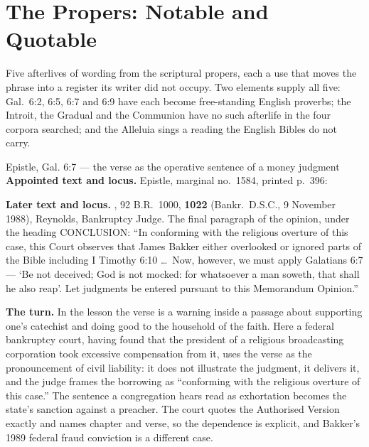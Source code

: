 \sectionguard
\section*{The Propers: Notable and Quotable}

Five afterlives of wording from the scriptural propers, each a use that moves the
phrase into a register its writer did not occupy. Two elements supply all five:
Gal.\ 6:2, 6:5, 6:7 and 6:9 have each become free-standing English proverbs; the
Introit, the Gradual and the Communion have no such afterlife in the four corpora
searched; and the Alleluia sings a reading the English Bibles do not carry.

\begin{afterlife}{Epistle, Gal. 6:7 --- the verse as the operative sentence of a money judgment}
\textbf{Appointed text and locus.} Epistle, marginal no.~1584, printed p.~396:

\textbf{Later text and locus.} , 92 B.R.\ 1000, \textbf{1022} (Bankr.\
D.S.C., 9 November 1988), Reynolds, Bankruptcy Judge. The final paragraph of the
opinion, under the heading CONCLUSION: ``In conforming with the religious overture
of this case, this Court observes that James Bakker either overlooked or ignored
parts of the Bible including I Timothy 6:10 \dots\ Now, however, we must apply
Galatians 6:7 --- `Be not deceived; God is not mocked: for whatsoever a man
soweth, that shall he also reap'. Let judgments be entered pursuant to this
Memorandum Opinion.''

\textbf{The turn.} In the lesson the verse is a warning inside a passage about
supporting one's catechist and doing good to the household of the faith. Here a
federal bankruptcy court, having found that the president of a religious
broadcasting corporation took excessive compensation from it, uses the verse as
the pronouncement of civil liability: it does not illustrate the judgment, it
delivers it, and the judge frames the borrowing as ``conforming with the religious
overture of this case.'' The sentence a congregation hears read as exhortation
becomes the state's sanction against a preacher. The court quotes the Authorised
Version exactly and names chapter and verse, so the dependence is explicit, and
Bakker's 1989 federal fraud conviction is a different case.
\end{afterlife}

